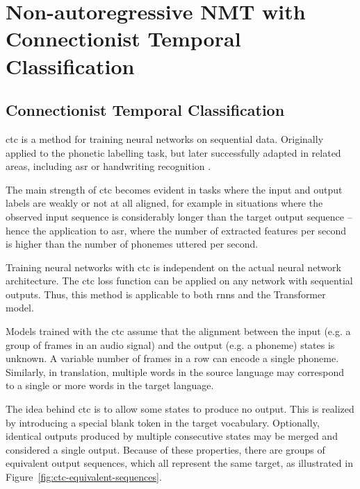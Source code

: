 \chapter{Non-autoregressive NMT with Connectionist Temporal Classification}
\label{chap:nar-nmt-ctc}



\section{Connectionist Temporal Classification}
\label{sec:ctc}

\Gls{ctc} \citep{graves2006connectionist} is a method for training neural
networks on sequential data. Originally applied to the phonetic labelling task,
but later successfully adapted in related areas, including \gls{asr} or
handwriting recognition \citep{liwicki2007novel, eyben2009speech,
  graves2014towards}.

The main strength of \gls{ctc} becomes evident in tasks where the input and
output labels are weakly or not at all aligned, for example in situations where
the observed input sequence is considerably longer than the target output
sequence -- hence the application to \gls{asr}, where the number of extracted
features per second is higher than the number of phonemes uttered per second.

Training neural networks with \gls{ctc} is independent on the actual neural
network architecture. The \gls{ctc} loss function can be applied on any network
with sequential outputs. Thus, this method is applicable to both \glspl{rnn}
and the Transformer model.

Models trained with the \gls{ctc} assume that the alignment between the input
(e.g. a group of frames in an audio signal) and the output (e.g. a phoneme)
states is unknown. A variable number of frames in a row can encode a single
phoneme. Similarly, in translation, multiple words in the source language may
correspond to a single or more words in the target language.

The idea behind \gls{ctc} is to allow some states to produce no output. This is
realized by introducing a special blank token in the target vocabulary.
Optionally, identical outputs produced by multiple consecutive states may be
merged and considered a single output. Because of these properties, there are
groups of equivalent output sequences, which all represent the same target, as
illustrated in Figure~\ref{fig:ctc-equivalent-sequences}.

